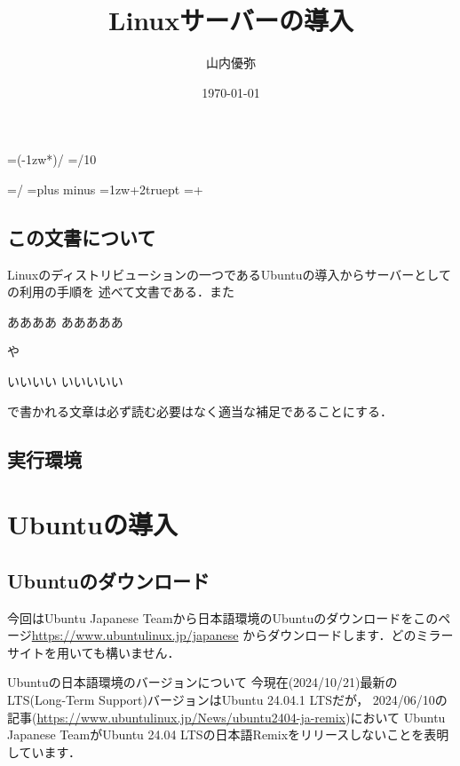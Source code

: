 \documentclass[dvipdfmx,a4paper,11pt]{jsbook}
\begin{document}
\setlength{\footskip}{20truemm}

\makeatletter
\newcount\@chars\newcount\@lines
{}                      %

\newdimen\@kanjiskip
\@kanjiskip=\dimexpr(\textwidth-1zw*\@chars)/\numexpr{}
\newdimen\@@kanjiskip
\@@kanjiskip=\dimexpr\@kanjiskip/10

\baselineskip=\dimexpr\textheight/\@lines
\kanjiskip=\@kanjiskip plus \@@kanjiskip minus \@@kanjiskip
\parindent=\dimexpr 1zw+2truept
\parindent=\dimexpr\parindent+\@kanjiskip
\makeatother


\title{Linuxサーバーの導入}
\author{山内優弥}
\date{\today}
\maketitle

\setcounter{tocdepth}{2}
\tableofcontents
\clearpage

\section{この文書について}
Linuxのディストリビューションの一つであるUbuntuの導入からサーバーとしての利用の手順を
述べて文書である．また
\begin{mainbox}{ああああ}
  あああああ
\end{mainbox}
や
\begin{subbox}{いいいい}
  いいいいい
\end{subbox}
で書かれる文章は必ず読む必要はなく適当な補足であることにする．
\section{実行環境} 
\chapter{Ubuntuの導入}
\section{Ubuntuのダウンロード}
今回はUbuntu Japanese Teamから日本語環境のUbuntuのダウンロードをこのページ\url{https://www.ubuntulinux.jp/japanese}
からダウンロードします．どのミラーサイトを用いても構いません．
\begin{mainbox}{Ubuntuの日本語環境のバージョンについて}
  今現在(2024/10/21)最新のLTS(Long-Term Support)バージョンはUbuntu 24.04.1 LTSだが，
  2024/06/10の記事(\url{https://www.ubuntulinux.jp/News/ubuntu2404-ja-remix})において
  Ubuntu Japanese TeamがUbuntu 24.04 LTSの日本語Remixをリリースしないことを表明しています．
\end{mainbox}
\end{document}
